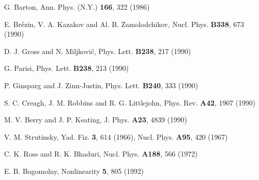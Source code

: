 \documentclass[11pt]{article}
\theoremstyle{plain}
\begin{document}
\begin{thebibliography}{21}
 G. Barton, Ann. Phys. (N.Y.) \textbf{166}, 322 (1986)

 E. Brézin, V. A. Kazakov and Al. B. Zamolodchikov, Nucl. Phys. \textbf{B338}, 673 (1990)

 D. J. Gross and N. Miljković, Phys. Lett. \textbf{B238}, 217 (1990)

 G. Parisi, Phys. Lett. \textbf{B238}, 213 (1990)

 P. Ginsparg and J. Zinn-Justin, Phys. Lett. \textbf{B240}, 333 (1990)

 S. C. Creagh, J. M. Robbins and R. G. Littlejohn, Phys. Rev. \textbf{A42}, 1907 (1990)

 M. V. Berry and J. P. Keating, J. Phys. \textbf{A23}, 4839 (1990)

 V. M. Strutinsky, Yad. Fiz. \textbf{3}, 614 (1966), Nucl. Phys. \textbf{A95}, 420 (1967)

 C. K. Ross and R. K. Bhaduri, Nucl. Phys. \textbf{A188}, 566 (1972)

 E. B. Bogomolny, Nonlinearity \textbf{5}, 805 (1992)

\end{thebibliography}
\end{document}
